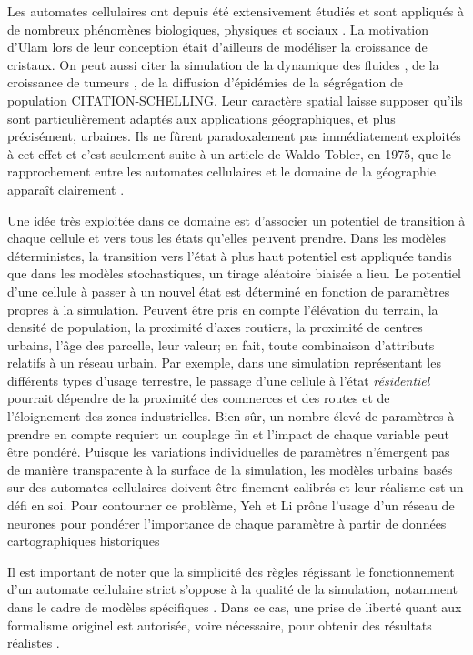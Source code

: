 \documentclass[10pt]{article}
\begin{document}
\begin{multicols}{2}
Les automates cellulaires ont depuis été extensivement étudiés et sont
appliqués à de nombreux phénomènes biologiques, physiques et sociaux
\cite{Ganguly}. La motivation d'Ulam lors de leur conception était
d'ailleurs de modéliser la croissance de cristaux. On peut aussi citer
la simulation de la dynamique des fluides \cite{Frisch1986}, de la
croissance de tumeurs \cite{Kansal2000}, de la diffusion d'épidémies
\cite{Fu2003} de la ségrégation de population CITATION-SCHELLING. Leur
caractère spatial laisse supposer qu'ils sont particulièrement adaptés
aux applications géographiques, et plus précisément, urbaines. Ils ne
fûrent paradoxalement pas immédiatement exploités à cet effet et c'est
seulement suite à un article de Waldo Tobler, en 1975, que le
rapprochement entre les automates cellulaires et le domaine de la
géographie apparaît clairement \cite{Tobler1975}.

Une idée très exploitée dans ce domaine est d'associer un potentiel de
transition à chaque cellule et vers tous les états qu'elles peuvent
prendre. Dans les modèles déterministes, la transition vers l'état à
plus haut potentiel est appliquée tandis que dans les modèles
stochastiques, un tirage aléatoire biaisée a lieu. Le potentiel d'une
cellule à passer à un nouvel état est déterminé en fonction de
paramètres propres à la simulation. Peuvent être pris en compte
l'élévation du terrain, la densité de population, la proximité d'axes
routiers, la proximité de centres urbains, l'âge des parcelle, leur
valeur; en fait, toute combinaison d'attributs relatifs à un réseau
urbain. Par exemple, dans une simulation représentant les différents
types d'usage terrestre, le passage d'une cellule à l'état
\textit{résidentiel} pourrait dépendre de la proximité des commerces
et des routes et de l'éloignement des zones industrielles. Bien sûr,
un nombre élevé de paramètres à prendre en compte requiert un couplage
fin et l'impact de chaque variable peut être pondéré. Puisque les
variations individuelles de paramètres n'émergent pas de manière
transparente à la surface de la simulation, les modèles urbains basés
sur des automates cellulaires doivent être finement calibrés et leur
réalisme est un défi en soi. Pour contourner ce problème, Yeh et Li
prône l'usage d'un réseau de neurones pour pondérer l'importance de
chaque paramètre à partir de données cartographiques historiques
\cite{Yeh2002}

Il est important de noter que la simplicité des règles régissant le
fonctionnement d'un automate cellulaire strict s'oppose à la qualité
de la simulation, notamment dans le cadre de modèles spécifiques
\cite{Torrens2001}. Dans ce cas, une prise de liberté quant aux
formalisme originel est autorisée, voire nécessaire, pour obtenir des
résultats réalistes \cite{White1998}.


\end{multicols}
\end{document}
